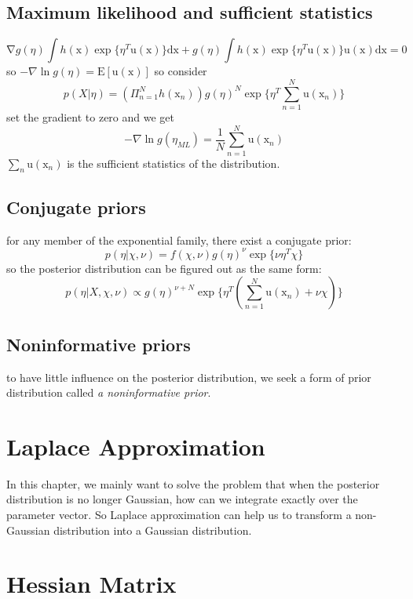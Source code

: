 \documentclass[a4paper]{book}
\begin{document}
\subsection{Maximum likelihood and sufficient statistics}
\begin{equation}\label{1.4.3}
  \mathrm  \nabla g(\eta) \int h(\mathrm  x)\exp\{\eta^T\mathrm  u(\mathrm  x)\}\mathrm  {dx} +g(\eta)\int h(\mathrm  x)\exp\{\eta^T\mathrm u(\mathrm x)\} \mathrm u(\mathrm  x) \mathrm {dx} = 0
\end{equation}
so $-\nabla \ln g(\eta) = \mathrm E[\mathrm  u(\mathrm  x)] $\newline
so consider
$$p(X|\eta)  = (\Pi_{n=1}^Nh(\mathrm  x_n))g(\eta)^N\exp\{\eta^T\sum_{n=1}^N\mathrm  u(\mathrm  x_n) \}$$
set the gradient to zero and we get
\begin{equation}\label{1.4.4}
  -\nabla \ln g(\eta_{ML} ) = \frac1N\sum_{n=1}^N\mathrm  u(\mathrm  x_n)
\end{equation}
$\sum_n\mathrm  u(\mathrm  x_n)$ is the sufficient statistics of the distribution.
\subsection{Conjugate priors}
for any member of the exponential family, there exist a conjugate  prior:
$$p(\eta|\chi, \nu) = f(\chi,\nu)g(\eta)^\nu\exp\{\nu\eta^T\chi\}$$
so the posterior distribution can be figured out as the same form:
$$p(\eta|X,\chi,\nu) \propto g(\eta)^{\nu+N}\exp\{\eta^T(\sum_{n=1}^N\mathrm  u(\mathrm  x_n)+\nu\chi)\}$$
\subsection{Noninformative priors}
to have little influence on the posterior distribution, we seek a form of prior distribution called \emph{a noninformative prior}.






\section{Laplace Approximation}
In this chapter, we mainly want to solve the problem that when the posterior distribution is no longer Gaussian, how can we integrate exactly over the parameter vector.\newline
So Laplace approximation can help us to transform a non-Gaussian distribution  into a Gaussian distribution.
\section{Hessian Matrix}
\end{document}
